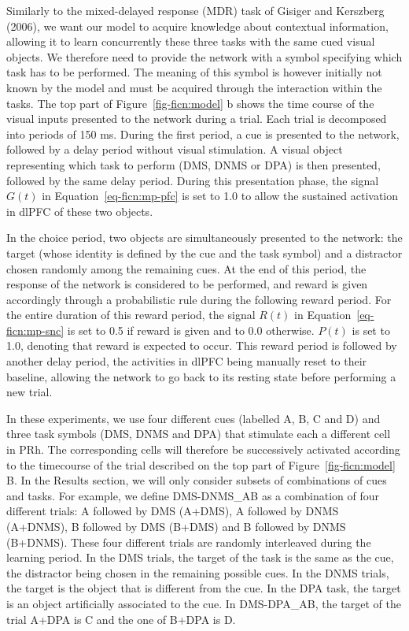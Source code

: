 \documentclass[
  11pt,
  a4paper,
]{scrbook}
\begin{document}
Similarly to the mixed-delayed response (MDR) task of Gisiger and
Kerszberg (2006), we want our model to acquire knowledge about
contextual information, allowing it to learn concurrently these three
tasks with the same cued visual objects. We therefore need to provide
the network with a symbol specifying which task has to be performed. The
meaning of this symbol is however initially not known by the model and
must be acquired through the interaction within the tasks. The top part
of Figure~\ref{fig-ficn:model} b shows the time course of the visual
inputs presented to the network during a trial. Each trial is decomposed
into periods of 150 ms. During the first period, a cue is presented to
the network, followed by a delay period without visual stimulation. A
visual object representing which task to perform (DMS, DNMS or DPA) is
then presented, followed by the same delay period. During this
presentation phase, the signal \(G(t)\) in Equation~\ref{eq-ficn:mp-pfc}
is set to 1.0 to allow the sustained activation in dlPFC of these two
objects.

In the choice period, two objects are simultaneously presented to the
network: the target (whose identity is defined by the cue and the task
symbol) and a distractor chosen randomly among the remaining cues. At
the end of this period, the response of the network is considered to be
performed, and reward is given accordingly through a probabilistic rule
during the following reward period. For the entire duration of this
reward period, the signal \(R(t)\) in Equation~\ref{eq-ficn:mp-snc} is
set to 0.5 if reward is given and to 0.0 otherwise. \(P(t)\) is set to
1.0, denoting that reward is expected to occur. This reward period is
followed by another delay period, the activities in dlPFC being manually
reset to their baseline, allowing the network to go back to its resting
state before performing a new trial.

In these experiments, we use four different cues (labelled A, B, C and
D) and three task symbols (DMS, DNMS and DPA) that stimulate each a
different cell in PRh. The corresponding cells will therefore be
successively activated according to the timecourse of the trial
described on the top part of Figure~\ref{fig-ficn:model} B. In the
Results section, we will only consider subsets of combinations of cues
and tasks. For example, we define DMS-DNMS\_AB as a combination of four
different trials: A followed by DMS (A+DMS), A followed by DNMS
(A+DNMS), B followed by DMS (B+DMS) and B followed by DNMS (B+DNMS).
These four different trials are randomly interleaved during the learning
period. In the DMS trials, the target of the task is the same as the
cue, the distractor being chosen in the remaining possible cues. In the
DNMS trials, the target is the object that is different from the cue. In
the DPA task, the target is an object artificially associated to the
cue. In DMS-DPA\_AB, the target of the trial A+DPA is C and the one of
B+DPA is D.
\end{document}
